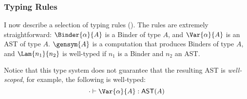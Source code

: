 


\subsubsection{Typing Rules}
I now describe a selection of \coreLang{} typing rules (). The rules are extremely straightforward: $\Binder{\alpha}{A}$ is a \textsf{Binder} of type $A$, and $\Var{\alpha}{A}$ is an \textsf{AST} of type $A$. $\gensym{A}$ is a computation that produces \textsf{Binder}s of type $A$, and $\Lam{n_1}{n_2}$ is well-typed if $n_1$ is a \textsf{Binder} and $n_2$ an AST. 

Notice that this type system does not guarantee that the resulting AST is \textit{well-scoped}, for example, the following is well-typed:
\[\cdot \vdash {\Var{\alpha}{A}}: {\textsf{AST}(A)}\]

